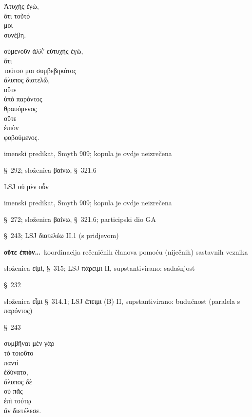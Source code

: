 
{\large
\begin{greek}
\noindent Ἀτυχὴς ἐγώ, \\
\tabto{2em} ὅτι τοῦτό \\
\tabto{2em} μοι \\
\tabto{2em} συνέβη.

\noindent οὐμενοῦν ἀλλ̓' εὐτυχὴς ἐγώ, \\
\tabto{2em} ὅτι \\
\tabto{4em} τούτου μοι συμβεβηκότος \\
\tabto{2em} ἄλυπος διατελῶ, \\
οὔτε \\
\tabto{4em} ὑπὸ παρόντος \\
\tabto{2em} θραυόμενος \\
οὔτε \\
\tabto{2em} ἐπιὸν \\
\tabto{2em} φοβούμενος. \\

\end{greek}
}

\begin{description}[noitemsep]
\item[Ἀτυχὴς] imenski predikat, Smyth 909; kopula je ovdje neizrečena
\item[συνέβη] §~292; složenica βαίνω, §~321.6
\item[οὐμενοῦν] LSJ οὐ μὲν οὖν
\item[εὐτυχὴς] imenski predikat, Smyth 909; kopula je ovdje neizrečena
\item[συμβεβηκότος] §~272; složenica βαίνω, §~321.6; participski dio GA
\item[διατελῶ] §~243; LSJ διατελέω II.1 (s pridjevom)
\item[οὔτε ὑπὸ παρόντος\dots] \textbf{οὔτε ἐπιὸν\dots}\ koordinacija rečeničnih članova pomoću (niječnih) sastavnih veznika
\item[παρόντος] složenica εἰμί, §~315; LSJ πάρειμι II, supstantivirano: sadašnjost
\item[θραυόμενος] §~232
\item[ἐπιὸν] složenica εἶμι §~314.1; LSJ ἔπειμι (B) II, supstantivirano: budućnost (paralela s \textgreek[variant=ancient]{παρόντος)}
\item[φοβούμενος] §~243

\end{description}

{\large
\begin{greek}
\noindent συμβῆναι μὲν γὰρ \\
\tabto{2em} τὸ τοιοῦτο \\
\tabto{2em} παντὶ \\
ἐδύνατο, \\
ἄλυπος δὲ \\
οὐ πᾶς \\
\tabto{2em} ἐπὶ τούτῳ \\
ἂν διετέλεσε.\\

\end{greek}
}

